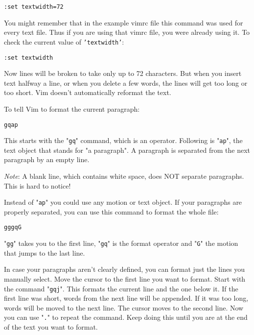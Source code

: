 {{\begin{Verbatim}[samepage=true]
 :set textwidth=72
\end{Verbatim}

You might remember that in the example vimrc file this command was used for every text file.
Thus if you are using that vimrc file, you were already using it.
To check the current value of \texttt{'textwidth'}:

\begin{Verbatim}[samepage=true]
 :set textwidth
\end{Verbatim}

Now lines will be broken to take only up to 72 characters.
But when you insert text halfway a line, or when you delete a few words, the lines will get too long or too short.
Vim doesn't automatically reformat the text.

To tell Vim to format the current paragraph:

\begin{Verbatim}[samepage=true]
 gqap
\end{Verbatim}

This starts with the "\texttt{gq}" command, which is an operator.
Following is "\texttt{ap}", the text object that stands for "a paragraph".
A paragraph is separated from the next paragraph by an empty line.

\emph{Note}:
A blank line, which contains white space, does NOT separate paragraphs.
This is hard to notice!

Instead of "\texttt{ap}" you could use any motion or text object.
If your paragraphs are properly separated, you can use this command to format the whole file:

\begin{Verbatim}[samepage=true]
 gggqG
\end{Verbatim}

"\texttt{gg}" takes you to the first line, "\texttt{gq}" is the format operator and "\texttt{G}" the motion that jumps to the last line.

In case your paragraphs aren't clearly defined, you can format just the lines you manually select.
Move the cursor to the first line you want to format.
Start with the command "\texttt{gqj}".
This formats the current line and the one below it.
If the first line was short, words from the next line will be appended.
If it was too long, words will be moved to the next line.
The cursor moves to the second line.
Now you can use "\texttt{.}" to repeat the command.
Keep doing this until you are at the end of the text you want to format.

}}
